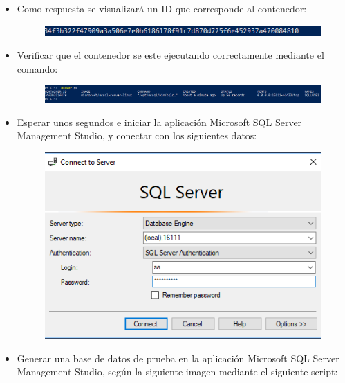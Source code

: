 \begin{itemize}
	\item Como respuesta se visualizará un ID que corresponde al contenedor:
                     \begin{figure}[H]
		\begin{center}
		\includegraphics[width=15cm]{./Imagenes/14}
		\end{center}
		\end{figure}   
	\item Verificar que el contenedor se este ejecutando correctamente mediante el comando:
                     \begin{figure}[H]
		\begin{center}
		\includegraphics[width=15cm]{./Imagenes/15}
		\end{center}
		\end{figure}   
           \item Esperar unos segundos e iniciar la aplicación Microsoft SQL Server Management Studio, y conectar con los siguientes datos:
                     \begin{figure}[H]
		\begin{center}
		\includegraphics[width=15cm]{./Imagenes/33}
		\end{center}
		\end{figure}   
	\item Generar una base de datos de prueba en la aplicación Microsoft SQL Server Management Studio, según la siguiente imagen mediante el siguiente script:

\end{itemize}
